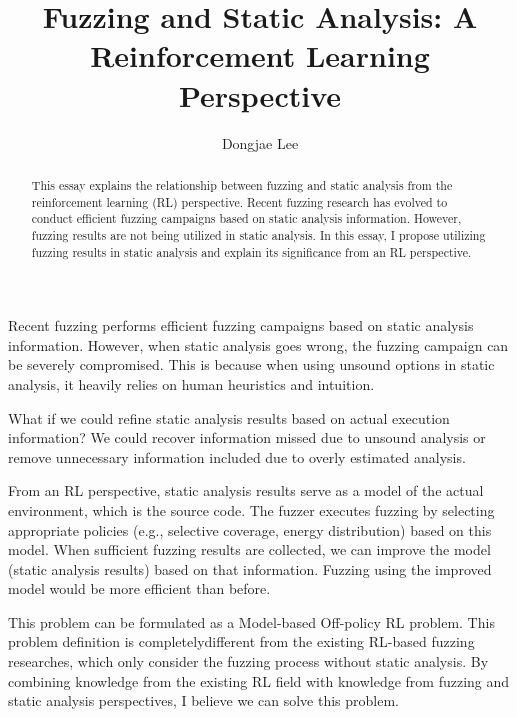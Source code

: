 \documentclass[11pt, oneside]{article}   	%
\title{Fuzzing and Static Analysis: A Reinforcement Learning Perspective}
\author{Dongjae Lee}
\date{}
\begin{document}
\maketitle

\begin{abstract}
	This essay explains the relationship between fuzzing and static analysis from the reinforcement learning (RL) perspective. Recent fuzzing research has evolved to conduct efficient fuzzing campaigns based on static analysis information. However, fuzzing results are not being utilized in static analysis. In this essay, I propose utilizing fuzzing results in static analysis and explain its significance from an RL perspective.
\end{abstract}

Recent fuzzing performs efficient fuzzing campaigns based on static analysis information. However, when static analysis goes wrong, the fuzzing campaign can be severely compromised. This is because when using unsound options in static analysis, it heavily relies on human heuristics and intuition.

What if we could refine static analysis results based on actual execution information? We could recover information missed due to unsound analysis or remove unnecessary information included due to overly estimated analysis.

From an RL perspective, static analysis results serve as a model of the actual environment, which is the source code. The fuzzer executes fuzzing by selecting appropriate policies (e.g., selective coverage, energy distribution) based on this model. When sufficient fuzzing results are collected, we can improve the model (static analysis results) based on that information. Fuzzing using the improved model would be more efficient than before.

This problem can be formulated as a Model-based Off-policy RL problem. This problem definition is completelydifferent from the existing RL-based fuzzing researches, which only consider the fuzzing process without static analysis. By combining knowledge from the existing RL field with knowledge from fuzzing and static analysis perspectives, I believe we can solve this problem.
\end{document}
